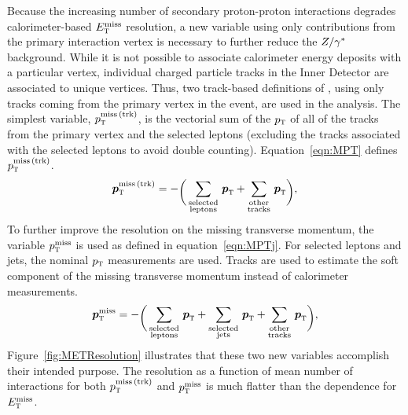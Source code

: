Because the increasing number of secondary proton-proton interactions degrades calorimeter-based $E_{\textrm{\footnotesize\sc t}}^{\rm miss}$ resolution, a new variable using only contributions from the primary interaction vertex is necessary to further reduce the $Z/\gamma^{\ast}$ background. While it is not possible to associate calorimeter energy deposits with a particular vertex, individual charged particle tracks in the Inner Detector are associated to unique vertices. Thus, two track-based definitions of \met, using only tracks coming from the primary vertex in the event, are used in the analysis. The simplest variable, $p_{\textrm{\footnotesize\sc t}}^{\rm miss\,(trk)}$, is the vectorial sum of the $p_{\textrm{\footnotesize\sc t}}$ of all of the tracks from the primary vertex and the selected leptons (excluding the tracks associated with the selected leptons to avoid double counting). Equation~\ref{eqn:MPT} defines $p_{\textrm{\footnotesize\sc t}}^{\rm miss\,(trk)}$.
%
\begin{equation}
\vMPT = -\raisebox{-3.0pt}{\bigg(}%
     \displaystyle
     \sum_{\substack{\rm selected \\ \rm leptons}}\,\vpT
   + \sum_{\substack{\rm other \\ \rm tracks}}\,\vpT
   \raisebox{-3.0pt}{\bigg)},
\label{eqn:MPT}
\end{equation} 
%
To further improve the resolution on the missing transverse momentum, the variable $p_{\textrm{\footnotesize\sc t}}^{\rm miss}$ is used as defined in equation~\ref{eqn:MPTj}. For selected leptons and jets, the nominal $p_{\textrm{\footnotesize\sc t}}$ measurements are used. Tracks are used to estimate the soft component of the missing transverse momentum instead of calorimeter measurements. 
%
\begin{equation}
\vMPTj = -\raisebox{-3.0pt}{\bigg(}%
     \displaystyle
     \sum_{\substack{\rm selected \\ \rm leptons}}\,\vpT
   + \sum_{\substack{\rm selected \\ \rm jets}}\,\vpT
   + \sum_{\substack{\rm other \\ \rm tracks}}\,\vpT
   \raisebox{-3.0pt}{\bigg)},
\label{eqn:MPTj}
\end{equation} 
%
Figure~\ref{fig:METResolution} illustrates that these two new variables accomplish their intended purpose. The resolution as a function of mean number of interactions for both $p_{\textrm{\footnotesize\sc t}}^{\rm miss\,(trk)}$ and $p_{\textrm{\footnotesize\sc t}}^{\rm miss}$ is much flatter than the dependence for $E_{\textrm{\footnotesize\sc t}}^{\rm miss}$. 
%
